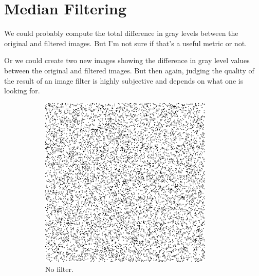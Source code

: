 \section{Median Filtering}
We could probably compute the total difference in gray levels between the original and filtered images.
But I'm not sure if that's a useful metric or not.

Or we could create two new images showing the difference in gray level values between the original and filtered images.
But then again, judging the quality of the result of an image filter is highly subjective and depends on what one is looking for.

\begin{figure}[h]
    \centering

    \begin{subfigure}{0.3\textwidth}
        \includegraphics[width=0.9\textwidth]{../code/2_out/2-1_sp.png}
        \caption{No filter.}
        \label{fig:2-2-1:1}
    \end{subfigure}
    \begin{subfigure}{0.3\textwidth}

\end{subfigure}
\end{figure}
